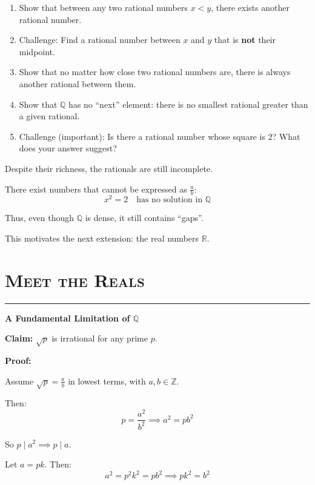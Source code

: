 \documentclass[11pt]{article}
\newcommand{\Z}{\mathbb{Z}}
\newcommand{\Q}{\mathbb{Q}}
\newcommand{\R}{\mathbb{R}}
\newcommand{\sepline}{
    \vspace{0.5em}
    \hrule
    \vspace{1em}
}
\begin{document}
\begin{problembox}
\begin{enumerate}
\item Show that between any two rational numbers $x < y$, there exists another rational number.

\item Challenge:  
Find a rational number between $x$ and $y$ that is \textbf{not} their midpoint.

\item Show that no matter how close two rational numbers are, there is always another rational between them.

\item Show that $\Q$ has no “next” element:
there is no smallest rational greater than a given rational.

\item Challenge (important):  
Is there a rational number whose square is $2$?  
What does your answer suggest?

\end{enumerate}

\end{problembox}

\begin{remarkbox}

Despite their richness, the rationals are still incomplete.

There exist numbers that cannot be expressed as $\frac{a}{b}$:
\[
x^2 = 2 \quad \text{has no solution in } \Q
\]

Thus, even though $\Q$ is dense, it still contains “gaps”.

This motivates the next extension: the real numbers $\R$.

\end{remarkbox}

\section*{\textsc{Meet the Reals}}
\sepline

\textbf{A Fundamental Limitation of $\Q$}

\textbf{Claim:} $\sqrt{p}$ is irrational for any prime $p$.

\textbf{Proof:}

Assume $\sqrt{p} = \frac{a}{b}$ in lowest terms, with $a,b \in \Z$.

Then:
\[
p = \frac{a^2}{b^2} \implies a^2 = p b^2
\]

So $p \mid a^2 \implies p \mid a$.

Let $a = pk$. Then:
\[
a^2 = p^2 k^2 = p b^2 \implies p k^2 = b^2
\]
\end{document}
